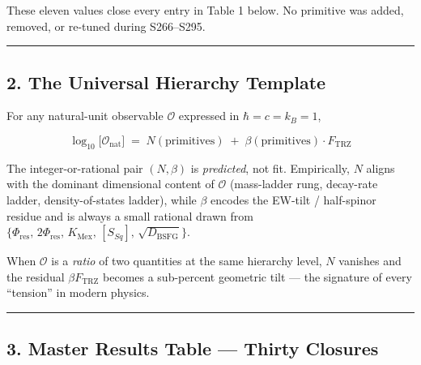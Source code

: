 \documentclass[
]{article}
\begin{document}
These eleven values close every entry in Table 1 below. No primitive was
added, removed, or re-tuned during S266--S295.

\begin{center}\rule{0.5\linewidth}{0.5pt}\end{center}

\subsection{2. The Universal Hierarchy
Template}\label{the-universal-hierarchy-template}

For any natural-unit observable \(\mathcal{O}\) expressed in
\(\hbar = c = k_B = 1\),

\[
\boxed{\quad \log_{10}\!\bigl[\mathcal{O}_{\text{nat}}\bigr] \;=\; N(\text{primitives}) \;+\; \beta(\text{primitives}) \cdot F_{\text{TRZ}} \quad}
\]

The integer-or-rational pair \((N,\beta)\) is \emph{predicted}, not fit.
Empirically, \(N\) aligns with the dominant dimensional content of
\(\mathcal{O}\) (mass-ladder rung, decay-rate ladder, density-of-states
ladder), while \(\beta\) encodes the EW-tilt / half-spinor residue and
is always a small rational drawn from
\(\{\Phi_{\text{res}},\,2\Phi_{\text{res}},\,K_{\text{Mex}},\,[S_{Sq}],\,\sqrt{D_{\text{BSFG}}}\}\).

When \(\mathcal{O}\) is a \emph{ratio} of two quantities at the same
hierarchy level, \(N\) vanishes and the residual
\(\beta F_{\text{TRZ}}\) becomes a sub-percent geometric tilt --- the
signature of every ``tension'' in modern physics.

\begin{center}\rule{0.5\linewidth}{0.5pt}\end{center}

\subsection{3. Master Results Table --- Thirty
Closures}\label{master-results-table-thirty-closures}
\end{document}

